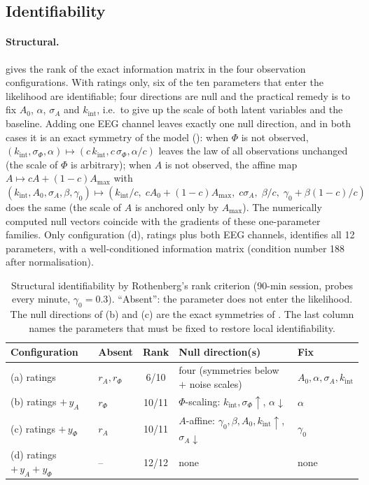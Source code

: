 \documentclass[12pt,a4paper]{article}
\theoremstyle{plain}
\theoremstyle{definition}
\theoremstyle{remark}
\newcommand{\kint}{k_{\mathrm{int}}}
\newcommand{\Amax}{A_{\max}}
\newcommand{\sA}{\sigma_{A}}
\newcommand{\sPhi}{\sigma_{\Phi}}
\newcommand{\rA}{r_{A}}
\newcommand{\rPhi}{r_{\Phi}}
\begin{document}
\subsection{Identifiability}
\label{sec:res-ident}

\paragraph{Structural.}  gives the rank of the exact information matrix in the four observation configurations. With ratings only, six of the ten parameters that enter the likelihood are identifiable; four directions are null and the practical remedy is to fix $A_0$, $\alpha$, $\sA$ and $\kint$, i.e.\ to give up the scale of both latent variables and the baseline. Adding one EEG channel leaves exactly one null direction, and in both cases it is an exact symmetry of the model (): when $\Phi$ is not observed, $(\kint,\sPhi,\alpha)\mapsto(c\,\kint,c\,\sPhi,\alpha/c)$ leaves the law of all observations unchanged (the scale of $\Phi$ is arbitrary); when $A$ is not observed, the affine map $A\mapsto cA+(1-c)\Amax$ with $(\kint,A_0,\sA,\beta,\gamma_0)\mapsto(\kint/c,\;cA_0+(1-c)\Amax,\;c\sA,\;\beta/c,\;\gamma_0+\beta(1-c)/c)$ does the same (the scale of $A$ is anchored only by $\Amax$). The numerically computed null vectors coincide with the gradients of these one-parameter families. Only configuration (d), ratings plus both EEG channels, identifies all 12 parameters, with a well-conditioned information matrix (condition number 188 after normalisation).

\begin{table}[t]
\centering\small
\caption{Structural identifiability by Rothenberg's rank criterion (90-min session, probes every minute, $\gamma_0=0.3$). ``Absent'': the parameter does not enter the likelihood. The null directions of (b) and (c) are the exact symmetries of . The last column names the parameters that must be fixed to restore local identifiability.}
\label{tab:structural}
\footnotesize\setlength{\tabcolsep}{4pt}
\begin{tabular}{llcll}
\toprule
Configuration & Absent & Rank & Null direction(s) & Fix \\
\midrule
(a) ratings                      & $\rA,\rPhi$ & 6/10  & four (symmetries below $+$ noise scales) & $A_0,\alpha,\sA,\kint$ \\
(b) ratings $+\,y_A$             & $\rPhi$     & 10/11 & $\Phi$-scaling: $\kint,\sPhi\uparrow$, $\alpha\downarrow$ & $\alpha$ \\
(c) ratings $+\,y_\Phi$          & $\rA$       & 10/11 & $A$-affine: $\gamma_0,\beta,A_0,\kint\uparrow$, $\sA\downarrow$ & $\gamma_0$ \\
(d) ratings $+\,y_A+y_\Phi$      & --          & 12/12 & none & none \\
\bottomrule
\end{tabular}
\end{table}
\end{document}
